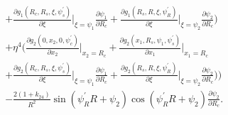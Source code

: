 \documentclass[12pt]{article}
\begin{document}
\begin{align}
&+\frac{\partial g_1(R_c,R_s,\xi,\psi_s^{\prime})}{\partial\xi}\bigg|_{\xi=\psi_1}\frac{\partial\psi_1}{\partial R_c}+\frac{\partial g_1(R_s,R,\xi,\psi_R^{\prime})}{\partial\xi}\bigg|_{\xi=\psi_2}\frac{\partial\psi_2}{\partial R_c}\bigg)\nonumber\\
&+\eta^4\bigg(\frac{\partial g_2(0,x_2,0,\psi_c^{\prime})}{\partial x_2}\bigg|_{x_2=R_c}+\frac{\partial g_2(x_1,R_s,\psi_1,\psi_s^{\prime})}{\partial x_1}\bigg|_{x_1=R_c}\nonumber\\
&+\frac{\partial g_2(R_c,R_s,\xi,\psi_s^{\prime})}{\partial\xi}\bigg|_{\xi=\psi_1}\frac{\partial\psi_1}{\partial R_c}+\frac{\partial g_2(R_s,R,\xi,\psi_R^{\prime})}{\partial\xi}\bigg|_{\xi=\psi_2}\frac{\partial\psi_2}{\partial R_c}\bigg)\bigg)\nonumber\\
&-\frac{2(1+k_{24})}{R^2}\sin(\psi_R^{\prime}R+\psi_2)\cos(\psi_R^{\prime}R+\psi_2)\frac{\partial\psi_2}{\partial R_c}.\label{eq:dEdRc}
\end{align}
\end{document}
